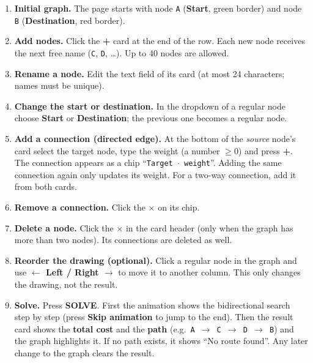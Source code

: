 \documentclass[11pt,letterpaper]{article}
\newcommand{\code}[1]{\texttt{#1}}
\begin{document}
\begin{enumerate}
  \item \textbf{Initial graph.} The page starts with node \code{A}
        (\textbf{Start}, green border) and node \code{B}
        (\textbf{Destination}, red border).
  \item \textbf{Add nodes.} Click the \textbf{+} card at the end of the row.
        Each new node receives the next free name (\code{C}, \code{D},
        \ldots). Up to 40 nodes are allowed.
  \item \textbf{Rename a node.} Edit the text field of its card (at most 24
        characters; names must be unique).
  \item \textbf{Change the start or destination.} In the dropdown of a
        regular node choose \textbf{Start} or \textbf{Destination}; the
        previous one becomes a regular node.
  \item \textbf{Add a connection (directed edge).} At the bottom of the
        \emph{source} node's card select the target node, type the weight
        (a number $\ge 0$) and press \textbf{+}. The connection appears as a
        chip ``\code{Target $\cdot$ weight}''. Adding the same connection
        again only updates its weight. For a two-way connection, add it from
        both cards.
  \item \textbf{Remove a connection.} Click the \textbf{$\times$} on its chip.
  \item \textbf{Delete a node.} Click the \textbf{$\times$} in the card
        header (only when the graph has more than two nodes). Its connections
        are deleted as well.
  \item \textbf{Reorder the drawing (optional).} Click a regular node in the
        graph and use \textbf{$\leftarrow$ Left / Right $\rightarrow$} to move
        it to another column. This only changes the drawing, not the result.
  \item \textbf{Solve.} Press \textbf{SOLVE}. First the animation shows the
        bidirectional search step by step (press \textbf{Skip animation} to
        jump to the end). Then the result card shows the
        \textbf{total cost} and the \textbf{path} (e.g.\
        \code{A $\rightarrow$ C $\rightarrow$ D $\rightarrow$ B}) and the
        graph highlights it. If no path exists, it shows ``No route found''.
        Any later change to the graph clears the result.
\end{enumerate}

\end{document}

